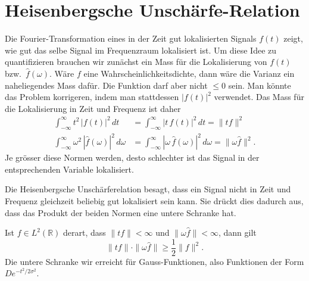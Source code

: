 %
%
%
\section{Heisenbergsche Unschärfe-Relation
\label{section:heisenberg}}
Die Fourier-Transformation eines in der Zeit gut lokalisierten
Signals $f(t)$ zeigt, wie gut das selbe Signal im Frequenzraum
lokalisiert ist.
Um diese Idee zu quantifizieren brauchen wir zunächst ein Mass für
die Lokalisierung von $f(t)$ bzw.~$\hat{f}(\omega)$.
Wäre $f$ eine Wahrscheinlichkeitsdichte, dann wäre die Varianz ein
naheliegendes Mass dafür.
Die Funktion darf aber nicht $\le 0$ sein. Man könnte das Problem korrigeren, indem man stattdessen $|f(t)|^2$ verwendet.
Das Mass für die Lokalisierung in Zeit und Frequenz ist daher
\begin{align*}
\int_{-\infty}^\infty
t^2 \, |f(t)|^2\,dt
&=
\int_{-\infty}^\infty
|t\,f(t)|^2\,dt
=
\|tf\|^2
\\
\int_{-\infty}^\infty
\omega^2\,|\hat{f}(\omega)|^2\,d\omega
&=
\int_{-\infty}^\infty
|\omega\,\hat{f}(\omega)|^2\,d\omega
=
\|\omega \hat{f}\|^2.
\end{align*}
Je grösser diese Normen werden, desto schlechter ist das Signal in der
entsprechenden Variable lokalisiert.

Die Heisenbergsche Unschärferelation besagt, dass ein Signal nicht
in Zeit und Frequenz gleichzeit beliebig gut lokalisiert sein kann.
Sie drückt dies dadurch aus, dass das Produkt der beiden Normen 
eine untere Schranke hat.

\begin{satz}[Heisenberg]
Ist $f\in L^2(\mathbb R)$ derart, dass 
$\|tf\|<\infty$ und $\|\omega\hat{f}\|<\infty$, dann gilt
\begin{equation}
\| tf \| \cdot \| \omega \hat{f}\| \ge \frac12\| f\|^2.
\label{heisenberg:gleichung}
\end{equation}
Die untere Schranke wir erreicht für Gauss-Funktionen, also Funktionen
der Form $De^{-t^2/2\sigma^2}$.
\end{satz}


